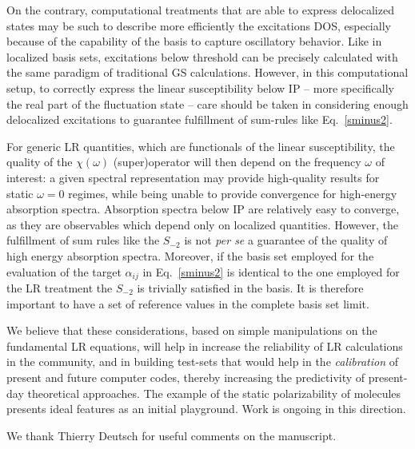 \documentclass[reprint,aps,prb]{revtex4-1}
\begin{document}
On the contrary, computational treatments that are able to express delocalized states may be such to describe more efficiently the excitations DOS,
especially because of the capability of the basis to capture oscillatory behavior. Like in localized basis sets, excitations below threshold can be
precisely calculated with the same paradigm of traditional GS calculations. However, in this computational setup, to correctly express the linear susceptibility below IP -- more specifically the real part of the fluctuation state -- care should be taken in considering enough delocalized excitations
to guarantee fulfillment of sum-rules like Eq.~\eqref{sminus2}.

For generic LR quantities, which are functionals of the linear susceptibility,
the quality of the $\chi(\omega)$ (super)operator will then depend
on the frequency $\omega$ of interest: a given spectral representation may provide high-quality results for static $\omega=0$ regimes, while being
unable to provide convergence for high-energy absorption spectra.
Absorption spectra below IP are relatively easy to converge, as they are observables which depend only on localized quantities.
However, the fulfillment of sum rules like the $S_{-2}$ is not \textit{per se}
a guarantee of the quality of high energy absorption spectra.
Moreover, if the basis set employed for the evaluation of the target $\alpha_{ij}$ in  Eq.~\eqref{sminus2} is identical to the one employed for the LR treatment the $S_{-2}$
is trivially satisfied in the basis. It is therefore important to have a set of reference values
in the complete basis set limit.

We believe that these considerations, based on simple manipulations on the fundamental LR equations, will help in increase the reliability of LR
calculations in the community, and in building test-sets that would help in the \emph{calibration} of present and future computer codes, thereby
increasing the predictivity of present-day theoretical approaches. The example of the static polarizability of molecules
presents ideal features as an initial playground. Work is ongoing in this direction.

\begin{acknowledgments}
We thank Thierry Deutsch for useful comments on the manuscript.
\end{acknowledgments}
\end{document}
